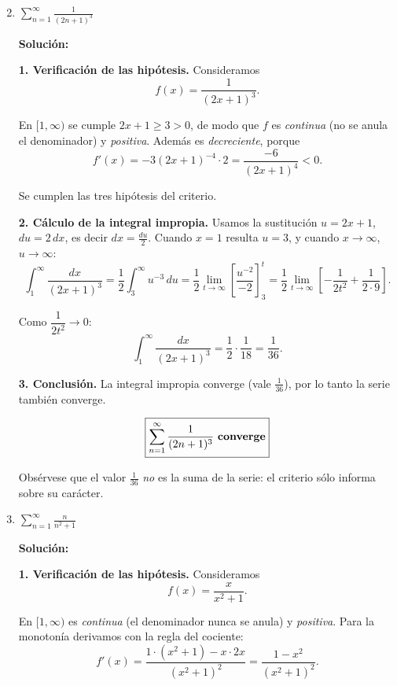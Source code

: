 \documentclass[12pt]{article}
\newcommand{\solucion}{%
    \vspace{0.8em}%
    \textbf{Solución:}%
}
\begin{document}
\begin{enumerate}[label=\alph*.-]

    \setcounter{enumi}{1} %

    \item $\displaystyle\sum_{n=1}^{\infty}\frac{1}{(2n+1)^{3}}$

    \solucion

    \textbf{1. Verificación de las hipótesis.} Consideramos
    \[
    f(x)=\frac{1}{(2x+1)^{3}} .
    \]

    En $[1,\infty)$ se cumple $2x+1\ge 3>0$, de modo que $f$ es
    \emph{continua} (no se anula el denominador) y \emph{positiva}. Además es
    \emph{decreciente}, porque
    \[
    f'(x)=-3(2x+1)^{-4}\cdot 2=\frac{-6}{(2x+1)^{4}}<0 .
    \]

    Se cumplen las tres hipótesis del criterio.

    \textbf{2. Cálculo de la integral impropia.} Usamos la sustitución
    $u=2x+1$, $du=2\,dx$, es decir $dx=\frac{du}{2}$. Cuando $x=1$ resulta
    $u=3$, y cuando $x\to\infty$, $u\to\infty$:
    \[
    \int_{1}^{\infty}\frac{dx}{(2x+1)^{3}}
    =\frac12\int_{3}^{\infty}u^{-3}\,du
    =\frac12\lim_{t\to\infty}\left[\frac{u^{-2}}{-2}\right]_{3}^{t}
    =\frac12\lim_{t\to\infty}\left[-\frac{1}{2t^{2}}+\frac{1}{2\cdot 9}\right].
    \]

    Como $\dfrac{1}{2t^{2}}\to 0$:
    \[
    \int_{1}^{\infty}\frac{dx}{(2x+1)^{3}}
    =\frac12\cdot\frac{1}{18}=\frac{1}{36}.
    \]

    \textbf{3. Conclusión.} La integral impropia converge (vale $\frac{1}{36}$),
    por lo tanto la serie también converge.

    \[
    \boxed{
    \sum_{n=1}^{\infty}\frac{1}{(2n+1)^{3}}
    \text{ \textbf{converge}}
    }
    \]

    Obsérvese que el valor $\frac{1}{36}$ \emph{no} es la suma de la serie: el
    criterio sólo informa sobre su carácter.

    \item $\displaystyle\sum_{n=1}^{\infty}\frac{n}{n^{2}+1}$

    \solucion

    \textbf{1. Verificación de las hipótesis.} Consideramos
    \[
    f(x)=\frac{x}{x^{2}+1} .
    \]

    En $[1,\infty)$ es \emph{continua} (el denominador nunca se anula) y
    \emph{positiva}. Para la monotonía derivamos con la regla del cociente:
    \[
    f'(x)=\frac{1\cdot(x^{2}+1)-x\cdot 2x}{(x^{2}+1)^{2}}
    =\frac{1-x^{2}}{(x^{2}+1)^{2}} .
    \]


\end{enumerate}
\end{document}
